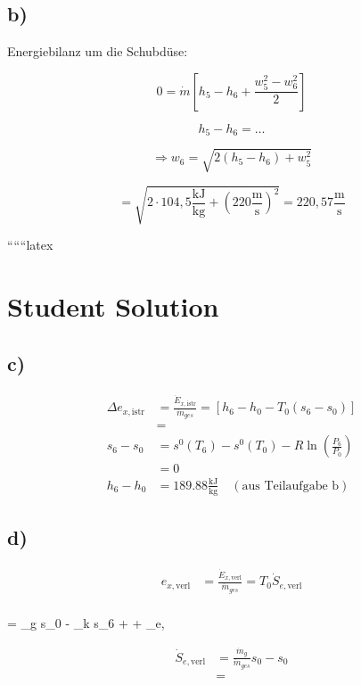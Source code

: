 \subsection*{b)}

Energiebilanz um die Schubdüse:

\[
0 = \dot{m} \left[ h_5 - h_6 + \frac{w_5^2 - w_6^2}{2} \right]
\]

\[
h_5 - h_6 = \dots
\]

\[
\Rightarrow w_6 = \sqrt{2 \left( h_5 - h_6 \right) + w_5^2}
\]

\[
= \sqrt{2 \cdot 104,5 \frac{\text{kJ}}{\text{kg}} + (220 \frac{\text{m}}{\text{s}})^2} = 220,57 \frac{\text{m}}{\text{s}}
\]

``````latex


\section*{Student Solution}

\subsection*{c)}

\begin{align*}
\Delta e_{x,\text{istr}} &= \frac{\dot{E}_{x,\text{istr}}}{\dot{m}_{ges}} = \left[ h_6 - h_0 - T_0 (s_6 - s_0) \right] \\
&= \\
s_6 - s_0 &= s^0(T_6) - s^0(T_0) - R \ln \left( \frac{P_6}{P_0} \right) \\
&= 0 \\
h_6 - h_0 &= 189.88 \frac{\text{kJ}}{\text{kg}} \quad (\text{aus Teilaufgabe b})
\end{align*}

\subsection*{d)}

\begin{align*}
e_{x,\text{verl}} &= \frac{\dot{E}_{x,\text{verl}}}{\dot{m}_{ges}} = T_0 \dot{S}_{e, \text{verl}} \\
\end{align*}

  = _g s_0 - _k s_6 +  + _{e, }

\begin{align*}
\dot{S}_{e, \text{verl}} &= \frac{\dot{m}_g}{\dot{m}_{ges}} s_0 - s_0 \\
&= \\
\end{align*}

